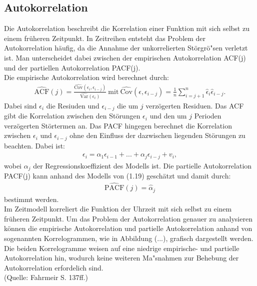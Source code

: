 \subsection{Autokorrelation}
Die Autokorrelation beschreibt die Korrelation einer Funktion mit sich selbst zu einem früheren Zeitpunkt. In Zeitreihen entsteht das Problem der Autokorrelation häufig, da die Annahme der unkorrelierten Störgrö"sen verletzt ist. Man unterscheidet dabei zwischen der empirischen Autokorrelation ACF(j) und der partiellen Autokorrelation PACF(j).\\
Die empirische Autokorrelation wird berechnet durch:
\begin{align}
\widehat{\text{ACF}}(j)=\frac{\widehat{\text{Cov}}(\epsilon_{i},\epsilon_{i-j})}{\widehat{\text{Var}}(\epsilon_{i})} ~\text{mit} ~\widehat{\text{Cov}}(\epsilon,\epsilon_{i-j})=\frac{1}{n}\sum_{i=j+1}^{n}\hat{\epsilon}_{i}\hat{\epsilon}_{i-j}.
\end{align}
Dabei sind $\epsilon_{i}$ die Resiuden und $\epsilon_{i-j}$ die um $j$ verzögerten Residuen. Das ACF gibt die Korrelation zwischen den Störungen $\epsilon_{i}$ und den um $j$ Perioden verzögerten Störtermen an. Das PACF hingegen berechnet die Korrelation zwischen $\epsilon_{i}$ und $\epsilon_{i-j}$ ohne den Einfluss der dazwischen liegenden Störungen zu beachten. Dabei ist:
\begin{align}
\epsilon_{i}=\alpha_{1}\epsilon_{i-1}+...+\alpha_{j}\epsilon_{i-j}
+v_{i},
\end{align}
wobei $\alpha_{j}$ der Regressionskoeffizient des Modells ist. Die partielle Autokorrelation PACF(j) kann anhand des Modells von (1.19) geschätzt und damit durch:
\begin{align}
\widehat{\text{PACF}}(j)=\hat{\alpha}_{j}
\end{align}
bestimmt werden.\\
Im Zeitmodell korreliert die Funktion der Uhrzeit mit sich selbst zu einem früheren Zeitpunkt. Um das Problem der Autokorrelation genauer zu analysieren können die empirische Autokorrelation und partielle Autokorrelation anhand von sogenannten Korrelogrammen, wie in Abbildung (...), grafisch dargestellt werden. Die beiden Korrelogramme weisen auf eine niedrige empirische- und partielle Autokorrelation hin, wodurch keine weiteren Ma"snahmen zur Behebung der Autokorrelation erfordelich sind.\\
(Quelle: Fahrmeir S. 137ff.)